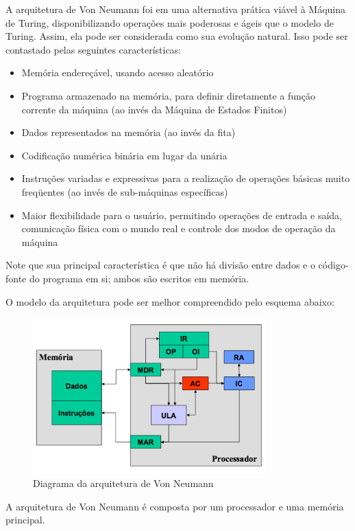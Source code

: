 A arquitetura de Von Neumann foi em uma alternativa prática viável à Máquina de Turing, disponibilizando operações mais poderosas e ágeis que o modelo de Turing. Assim, ela pode ser considerada como sua evolução natural. Isso pode ser contastado pelas seguintes características:
\begin{itemize}
	\item Memória endereçável, usando acesso aleatório
	\item Programa armazenado na memória, para definir diretamente a função corrente da máquina (ao invés da Máquina de Estados Finitos)
	\item Dados representados na memória (ao invés da fita)
	\item Codificação numérica binária em lugar da unária
	\item Instruções variadas e expressivas para a realização de operações básicas muito freqüentes (ao invés de sub-máquinas específicas)
	\item Maior flexibilidade para o usuário, permitindo operações de entrada e saída, comunicação física com o mundo real e controle dos modos de operação da máquina 
\end{itemize}


Note que sua principal característica é que não há divisão entre dados e o código-fonte do programa em si; ambos são escritos em memória. 


O modelo da arquitetura pode ser melhor compreendido pelo esquema abaixo:

\begin{figure}[H]
	\centering 
	\includegraphics[width=0.8\textwidth]{img/von_neumann.png}  
	\caption{Diagrama da arquitetura de Von Neumann}
	\label{fig:von_neumann}
\end{figure}

A arquitetura de Von Neumann é composta por um processador e uma memória principal. 


